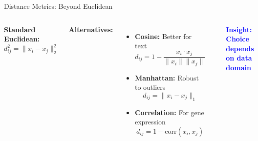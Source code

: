 \documentclass[aspectratio=169]{beamer}
\newcommand{\conceptbox}[2]{\colorbox{#1!20}{\textcolor{#1}{\textbf{#2}}}}
\newcommand{\insight}[1]{\conceptbox{blue}{Insight: #1}}
\begin{document}
\begin{frame}{Distance Metrics: Beyond Euclidean}
\begin{columns}
\textbf{Standard Euclidean:}
$$d_{ij}^2 = \|x_i - x_j\|_2^2$$

\textbf{Alternatives:}
\begin{itemize}
\item \textbf{Cosine:} Better for text
$$d_{ij} = 1 - \frac{x_i \cdot x_j}{\|x_i\|\|x_j\|}$$

\item \textbf{Manhattan:} Robust to outliers
$$d_{ij} = \|x_i - x_j\|_1$$

\item \textbf{Correlation:} For gene expression
$$d_{ij} = 1 - \text{corr}(x_i, x_j)$$
\end{itemize}

\begin{center}
\end{center}

\insight{Choice depends on data domain}
\end{columns}
\end{frame}
\end{document}
